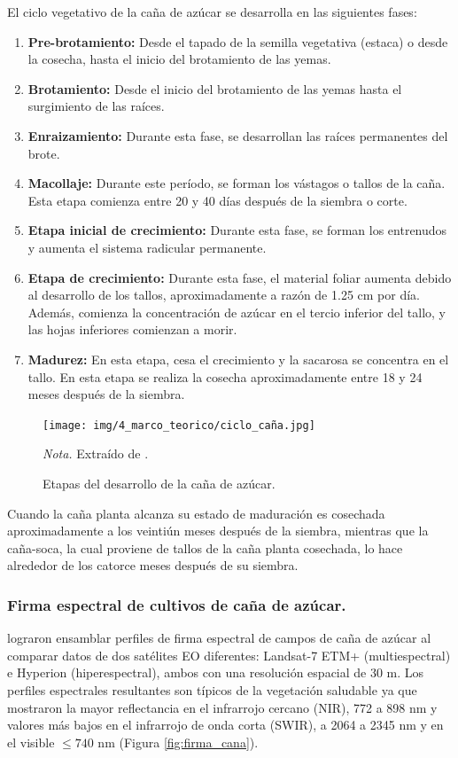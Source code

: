 El ciclo vegetativo de la caña de azúcar se desarrolla en las siguientes fases:
\begin{enumerate}
    \item \textbf{Pre-brotamiento:} Desde el tapado de la semilla vegetativa (estaca) o desde la cosecha, hasta el inicio del brotamiento de las yemas.
    \item \textbf{Brotamiento:}  Desde el inicio del brotamiento de las yemas hasta el surgimiento de las raíces.
    \item \textbf{Enraizamiento:} Durante esta fase, se desarrollan las raíces permanentes del brote.
    \item \textbf{Macollaje:} Durante este período, se forman los vástagos o tallos de la caña. Esta etapa comienza entre 20 y 40 días después de la siembra o corte.
    \item \textbf{Etapa inicial de crecimiento:} Durante esta fase, se forman los entrenudos y aumenta el sistema radicular permanente.
    \item \textbf{Etapa de crecimiento:} Durante esta fase, el material foliar aumenta debido al desarrollo de los tallos, aproximadamente a razón de 1.25 cm 
    por día. Además, comienza la concentración de azúcar en el tercio inferior del tallo, y las hojas inferiores comienzan a morir.
    \item \textbf{Madurez:}  En esta etapa, cesa el crecimiento y la sacarosa se concentra en el tallo. En esta etapa se realiza la cosecha aproximadamente entre 18 y     24 meses después de la siembra.
\end{enumerate} 

\begin{figure}[H]
    \centering
    \caption{Etapas del desarrollo de la caña de azúcar.}
    \texttt{[image: img/4\_marco\_teorico/ciclo\_caña.jpg]}
    \label{fig:etapas_cana}
    \begin{flushleft}
        \textit{Nota.} Extraído de \citet{helfgott_cultivo_2016}. 
        \vspace{-\baselineskip}
    \end{flushleft}
\end{figure}

Cuando la caña planta alcanza su estado de maduración es cosechada aproximadamente a los veintiún meses después 
de la siembra, mientras que la caña-soca, la cual proviene de tallos de la caña planta cosechada, lo hace alrededor de los catorce meses después de su siembra. 


\subsubsection{Firma espectral de cultivos de caña de azúcar.}
\citet{hamzeh2016assessing} lograron ensamblar perfiles de firma espectral de campos de caña de azúcar al comparar datos de dos satélites EO diferentes: Landsat-7 ETM+ (multiespectral) e Hyperion (hiperespectral), ambos con una resolución espacial de 30 m. Los perfiles espectrales resultantes son típicos de la vegetación saludable ya que mostraron la mayor 
reflectancia en el infrarrojo cercano (NIR),  772 a 898 nm y valores más bajos en el infrarrojo de onda corta (SWIR), a 2064 a 2345 nm y en el visible $\le 740$ nm (Figura \ref{fig:firma_cana}).

